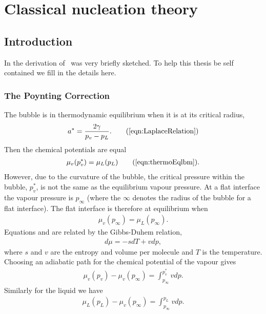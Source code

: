 \chapter{Classical nucleation theory}\label{ch:CNT}

\section{Introduction}
In  the derivation of \cnt\ was very briefly sketched.
To help this thesis be self contained we fill in the details here.

\subsection{The Poynting Correction}
The bubble is in thermodynamic equilibrium when it is at its critical radius, 
\begin{align}
  \astar = \frac{2\gamma}{p_v-p_L}. \tag{\ref{eqn:LaplaceRelation}}
\end{align}
Then the chemical potentials are equal
\begin{align}
  \mu_v(p_v^\ast) = \mu_L(p_L)\tag{\ref{eqn:thermoEqlbm}}.
\end{align}
However, due to the curvature of the bubble, the critical pressure within the bubble, $p_v^\ast$,
is not the same as the equilibrium vapour pressure.
At a flat interface the vapour pressure is  $p_\infty$ (where the $\infty$ denotes the radius of the bubble for a flat interface).
The flat interface is therefore at equilibrium when
\begin{align}
  \mu_v(p_{\infty}) =  \mu_L(p_{\infty}). \label{eqn:thermoEqlbmInfity}
\end{align}
Equations  and   are related by the Gibbs-Duhem relation,
\begin{align}
  d \mu = -s dT + v dp,
\end{align}
 where $s$ and $v$ are the entropy and volume per molecule and $T$ is the temperature.
Choosing an adiabatic path for the chemical potential of the vapour gives
\begin{align}
\mu_v(p_v) - \mu_v(p_{\infty}) =  \int_{p_{\infty}}^{p_v^\ast} v dp. \label{eqn:GDvapour} %
\end{align}
Similarly for the liquid we have
\begin{align}
\mu_L(p_L) - \mu_v(p_{\infty}) =  \int_{p_{\infty}}^{p_L} v dp.\label{eqn:GDLiquid}  %
\end{align}
